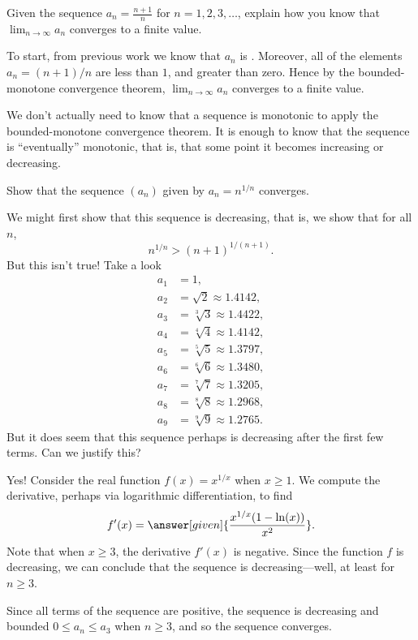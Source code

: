 \documentclass{ximera}
\begin{document}
\begin{example}
  Given the sequence $a_n=\frac{n+1}{n}$ for $n=1,2,3,\dots$,
  explain how you know that $\lim_{n\to\infty} a_n$ converges to a
  finite value.
  \begin{explanation}
    To start, from previous work we know that $a_n$ is
    .
    Moreover, all of the elements $a_n = (n+1)/n$ are less than $1$,
    and greater than zero. Hence by the bounded-monotone convergence
    theorem, $\lim_{n\to\infty} a_n$ converges to a finite value.
  \end{explanation}
\end{example}

We don't actually need to know that a sequence is monotonic to apply
the bounded-monotone convergence theorem. It is enough to know that
the sequence is ``eventually'' monotonic, that is, that some point it
becomes increasing or decreasing.

\begin{example}
Show that the sequence $(a_n)$ given by $a_n = n^{1/n}$ converges.
\begin{explanation}
  We might first show that this sequence is decreasing, that is, we show
  that for all $n$,
  \[
  n^{1/n} > (n+1)^{1/(n+1)}.
  \]
  But this isn't true!  Take a look
  \begin{align*}
    a_1 &= 1, \\
    a_2 &= \sqrt{2} \approx 1.4142, \\
    a_3 &= \sqrt[3]{3} \approx 1.4422, \\
    a_4 &= \sqrt[4]{4} \approx 1.4142, \\
    a_5 &= \sqrt[5]{5} \approx 1.3797, \\
    a_6 &= \sqrt[6]{6} \approx 1.3480, \\
    a_7 &= \sqrt[7]{7} \approx 1.3205, \\
    a_8 &= \sqrt[8]{8} \approx 1.2968, \\
    a_9 &= \sqrt[9]{9} \approx 1.2765.
  \end{align*}
  But it does seem that this sequence perhaps is decreasing after the
  first few terms.  Can we justify this?

  Yes!  Consider the real function $f(x)=x^{1/x}$ when $x\ge 1$.  We
  compute the derivative, perhaps via logarithmic differentiation, to find
  \[
  f'(x)=\answer[given]{\frac{x^{1/x} (1-\ln(x))}{x^2}}.
  \]
  Note that when $x\ge 3$, the derivative $f'(x)$ is negative.  Since
  the function $f$ is decreasing, we can conclude that the sequence is
  decreasing---well, at least for $n \geq 3$.

  Since all terms of the sequence are positive, the sequence is
  decreasing and bounded $0\le a_n \le a_3$ when $n \ge 3$, and so the
  sequence converges.
\end{explanation}
\end{example}
\end{document}
